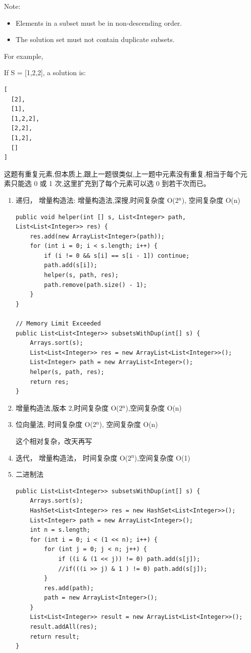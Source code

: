 \documentclass[12pt]{book}
\begin{document}
Note:
\begin{itemize}
\item Elements in a subset must be in non-descending order.
\item The solution set must not contain duplicate subsets.
\end{itemize}
For example,

If S = [1,2,2], a solution is:
\lstset{language=java,label= ,caption= ,numbers=none}
\begin{lstlisting}
[
  [2],
  [1],
  [1,2,2],
  [2,2],
  [1,2],
  []
]
\end{lstlisting}

这题有重复元素,但本质上,跟上一题很类似,上一题中元素没有重复,相当于每个元素只能选 0 或 1 次,这里扩充到了每个元素可以选 0 到若干次而已。

\begin{enumerate}
\item 递归， 增量构造法: 增量构造法,深搜,时间复杂度 O(2$^{\text{n}}$), 空间复杂度 O(n)
\label{sec-9-1-2-1}


\lstset{language=java,label= ,caption= ,numbers=none}
\begin{lstlisting}
public void helper(int [] s, List<Integer> path, List<List<Integer>> res) {
    res.add(new ArrayList<Integer>(path));
    for (int i = 0; i < s.length; i++) {
        if (i != 0 && s[i] == s[i - 1]) continue;
        path.add(s[i]);
        helper(s, path, res);
        path.remove(path.size() - 1);
    }
}

// Memory Limit Exceeded
public List<List<Integer>> subsetsWithDup(int[] s) {
    Arrays.sort(s); 
    List<List<Integer>> res = new ArrayList<List<Integer>>();
    List<Integer> path = new ArrayList<Integer>();
    helper(s, path, res);
    return res;
}
\end{lstlisting}

\item 增量构造法,版本 2,时间复杂度 O(2$^{\text{n}}$),空间复杂度 O(n)
\label{sec-9-1-2-2}
\item 位向量法, 时间复杂度 O(2$^{\text{n}}$), 空间复杂度 O(n)
\label{sec-9-1-2-3}

这个相对复杂，改天再写
\item 迭代， 增量构造法， 时间复杂度 O(2$^{\text{n}}$),空间复杂度 O(1)
\label{sec-9-1-2-4}


\item 二进制法
\label{sec-9-1-2-5}

\lstset{language=java,label= ,caption= ,numbers=none}
\begin{lstlisting}
public List<List<Integer>> subsetsWithDup(int[] s) {
    Arrays.sort(s);   
    HashSet<List<Integer>> res = new HashSet<List<Integer>>();
    List<Integer> path = new ArrayList<Integer>();
    int n = s.length;
    for (int i = 0; i < (1 << n); i++) {
        for (int j = 0; j < n; j++) {
            if ((i & (1 << j)) != 0) path.add(s[j]);
            //if(((i >> j) & 1 ) != 0) path.add(s[j]);   
        }
        res.add(path);
        path = new ArrayList<Integer>();
    }
    List<List<Integer>> result = new ArrayList<List<Integer>>();
    result.addAll(res);
    return result;
}
\end{lstlisting}


\end{enumerate}
\end{document}

